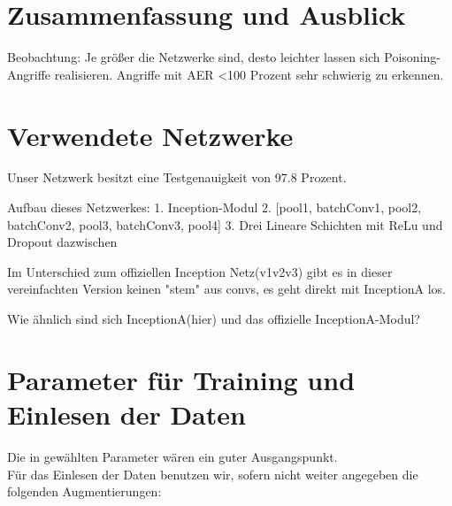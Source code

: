 \documentclass[11pt,a4paper]{article}
\numberwithin{equation}{section}
\begin{document}
	
	\section{Zusammenfassung und Ausblick} \label{chapter_conclusion}
	Beobachtung: Je größer die Netzwerke sind, desto leichter lassen sich Poisoning-Angriffe realisieren.
	Angriffe mit AER <100 Prozent sehr schwierig zu erkennen.
	
	
	\printglossaries
	\newpage
	\appendix
	\section{Verwendete Netzwerke}
	Unser Netzwerk besitzt eine Testgenauigkeit von 97.8 Prozent.
	
	Aufbau dieses Netzwerkes:
	1. Inception-Modul
	2. [pool1, batchConv1, pool2, batchConv2, pool3, batchConv3, pool4]
	3. Drei Lineare Schichten mit ReLu und Dropout dazwischen
	
	Im Unterschied zum offiziellen Inception Netz(v1v2v3) gibt es in dieser 
	vereinfachten Version keinen "stem" aus convs, 
	es geht direkt mit InceptionA los.
	
	Wie ähnlich sind sich InceptionA(hier) und das offizielle InceptionA-Modul?
	
	\section{Parameter für Training und Einlesen der Daten}\label{param_net}
	Die in \cite{CH} gewählten Parameter wären ein guter Ausgangspunkt.\\
	Für das Einlesen der Daten benutzen wir, sofern nicht weiter angegeben die folgenden Augmentierungen:
	
\end{document}
